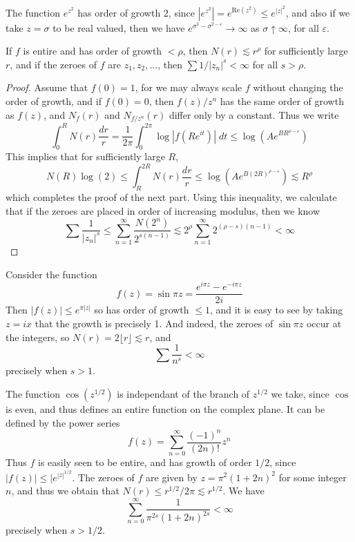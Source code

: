 \begin{example}
    The function $e^{z^2}$ has order of growth $2$, since $|e^{z^2}| = e^{\text{Re}(z^2)} \leq e^{|z|^2}$, and also if we take $z = \sigma$ to be real valued, then we have $e^{\sigma^2 - \sigma^{2 - \varepsilon}} \to \infty$ as $\sigma \uparrow \infty$, for all $\varepsilon$.
\end{example}

\begin{theorem}
    If $f$ is entire and has order of growth $< \rho$, then $N(r) \lesssim r^\rho$ for sufficiently large $r$, and if the zeroes of $f$ are $z_1, z_2, \dots$, then  $\sum 1/|z_n|^s < \infty$ for all $s > \rho$.
\end{theorem}
\begin{proof}
    Assume that $f(0) = 1$, for we may always scale $f$ without changing the order of growth, and if $f(0) = 0$, then $f(z)/z^n$ has the same order of growth as $f(z)$, and $N_f(r)$ and $N_{f/z^n}(r)$ differ only by a constant. Thus we write
    \[ \int_0^R N(r) \frac{dr}{r} = \frac{1}{2\pi} \int_0^{2\pi} \log |f(Re^{it})|\; dt \leq \log(Ae^{B R^{\rho - \varepsilon}}) \]
    This implies that for sufficiently large $R$,
    \[ N(R) \log(2) \leq \int_R^{2R} N(r) \frac{dr}{r} \leq \log(Ae^{B (2R)^{\rho - \varepsilon}}) \lesssim R^\rho \]
    which completes the proof of the next part. Using this inequality, we calculate that if the zeroes are placed in order of increasing modulus, then we know
    \[ \sum \frac{1}{|z_n|^s} \leq \sum_{n = 1}^\infty \frac{N(2^n)}{2^{s(n-1)}} \lesssim 2^\rho \sum_{n = 1}^\infty 2^{(\rho - s)(n-1)} < \infty \]
\end{proof}

\begin{example}
    Consider the function
    \[ f(z) = \sin \pi z = \frac{e^{i \pi z} - e^{- i \pi z}}{2i} \]
    Then $|f(z)| \leq e^{\pi |z|}$ so has order of growth $\leq 1$, and it is easy to see by taking $z = ix$ that the growth is precisely 1. And indeed, the zeroes of $\sin \pi z$ occur at the integers, so $N(r) = 2 \lfloor r \rfloor \lesssim r$, and
    \[ \sum \frac{1}{n^s} < \infty \]
    precisely when $s > 1$.
\end{example}

\begin{example}
    The function $\cos(z^{1/2})$ is independant of the branch of $z^{1/2}$ we take, since $\cos$ is even, and thus defines an entire function on the complex plane. It can be defined by the power series
    \[ f(z) = \sum_{n = 0}^\infty \frac{(-1)^n}{(2n)!} z^n \]
    Thus $f$ is easily seen to be entire, and has growth of order $1/2$, since $|f(z)| \leq |e^{|z|^{1/2}}$. The zeroes of $f$ are given by $z = \pi^2 (1 + 2n)^2$ for some integer $n$, and thus we obtain that $N(r) \leq r^{1/2}/2\pi \lesssim r^{1/2}$. We have
    \[ \sum_{n = 0}^\infty \frac{1}{\pi^{2s} (1 + 2n)^{2s}} < \infty \]
    precisely when $s > 1/2$.
\end{example}


